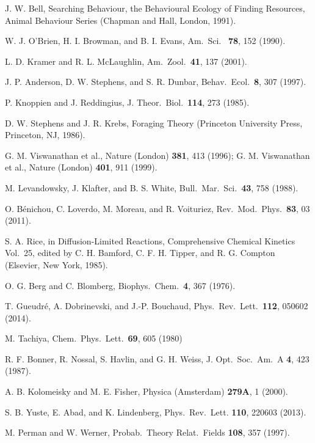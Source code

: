 \documentclass[11pt]{article}
\begin{document}
\begin{thebibliography}{99}

 J. W. Bell, Searching Behaviour, the Behavioural Ecology of
  Finding Resources, Animal Behaviour Series (Chapman and Hall, London,
  1991).

 W. J. O'Brien, H. I. Browman, and B. I. Evans, Am.\ Sci.\ {\bf
    78}, 152 (1990).

 L. D. Kramer and R. L. McLaughlin, Am.\ Zool.\ {\bf 41}, 137 (2001).


 J. P. Anderson, D. W. Stephens, and S. R. Dunbar, Behav.\
  Ecol.\ {\bf 8}, 307 (1997).

 P. Knoppien and J. Reddingius, J. Theor.\ Biol.\ {\bf 114}, 273 (1985).

 D. W. Stephens and J. R. Krebs, Foraging Theory (Princeton
  University Press, Princeton, NJ, 1986).

 G. M. Viswanathan et al., Nature (London) {\bf 381}, 413
  (1996); G. M. Viswanathan et al., Nature (London) {\bf 401}, 911 (1999).

 M. Levandowsky, J. Klafter, and B. S. White, Bull.\ Mar.\
  Sci.\ {\bf 43}, 758 (1988).
    
 O. B\'enichou, C. Loverdo, M. Moreau, and R. Voituriez,
  Rev.\ Mod.\ Phys.\ {\bf 83}, 03 (2011).

 S. A. Rice, in Diffusion-Limited Reactions, Comprehensive
  Chemical Kinetics Vol.\ 25, edited by C. H. Bamford, C. F. H. Tipper, and
  R. G. Compton (Elsevier, New York, 1985).

 O. G. Berg and C. Blomberg, Biophys.\ Chem.\ {\bf 4}, 367
  (1976).

 T. Gueudr\'e, A. Dobrinevski, and J.-P. Bouchaud, Phys.\
  Rev.\ Lett.\ {\bf 112}, 050602 (2014).

\bibitem{T80} M. Tachiya, Chem.\ Phys.\ Lett.\ {\bf 69}, 605 (1980)

 R. F. Bonner, R. Nossal, S. Havlin, and G. H. Weiss, J. Opt.\
  Soc.\ Am.\ A {\bf 4}, 423 (1987).

 A. B. Kolomeisky and M. E. Fisher, Physica (Amsterdam) {\bf
    279A}, 1 (2000).

 S. B. Yuste, E. Abad, and K. Lindenberg, Phys.\ Rev.\
  Lett. {\bf 110}, 220603 (2013).

\bibitem{PW97} M. Perman and W. Werner, Probab.\ Theory Relat.\ Fields {\bf
    108}, 357 (1997).


\end{thebibliography}
\end{document}

